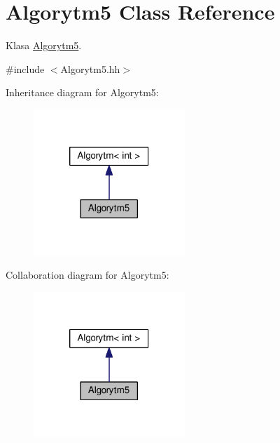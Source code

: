 \hypertarget{a00006}{}\section{Algorytm5 Class Reference}
\label{a00006}


Klasa \hyperlink{a00006}{Algorytm5}.  




{\ttfamily \#include $<$Algorytm5.\+hh$>$}



Inheritance diagram for Algorytm5\+:
\nopagebreak
\begin{figure}[H]
\begin{center}
\leavevmode
\includegraphics[width=162pt]{a00130}
\end{center}
\end{figure}


Collaboration diagram for Algorytm5\+:
\nopagebreak
\begin{figure}[H]
\begin{center}
\leavevmode
\includegraphics[width=162pt]{a00131}
\end{center}
\end{figure}
